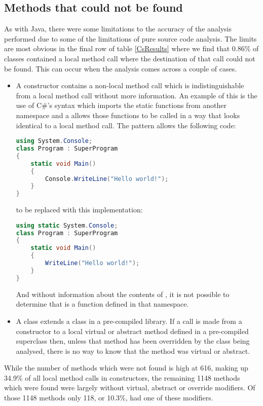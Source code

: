 \subsection{Methods that could not be found}
\label{MethodNotFound}
As with Java, there were some limitations to the accuracy of the analysis performed due to some of the limitations of pure source code analysis. The limits are most obvious in the final row of table \ref{CsResults} where we find that 0.86\% of classes contained a local method call where the destination of that call could not be found. This can occur when the analysis comes across a couple of cases.
\begin{itemize}
	\item A constructor contains a non-local method call which is indistinguishable from a local method call without more information. An example of this is the use of C\#'s  syntax which imports the static functions from another namespace and a allows those functions to be called in a way that looks identical to a local method call. The  pattern allows the following code:
	\begin{lstlisting}[language=cs]
using System.Console;
class Program : SuperProgram
{ 
	static void Main() 
	{ 
		Console.WriteLine("Hello world!"); 
	} 
}
	\end{lstlisting}
	to be replaced with this implementation:
	\begin{lstlisting}[language=cs]
using static System.Console;
class Program : SuperProgram
{ 
	static void Main() 
	{ 
		WriteLine("Hello world!"); 
	} 
}
	\end{lstlisting}
	And without information about the contents of , it is not possible to determine that  is a function defined in that namespace.
	\item A class extends a class in a pre-compiled library. If a call is made from a constructor to a local virtual or abstract method defined in a pre-compiled superclass then, unless that method has been overridden by the class being analysed, there is no way to know that the method was virtual or abstract.
\end{itemize}
While the number of methods which were not found is high at 616, making up 34.9\% of all local method calls in constructors, the remaining 1148 methods which were found were largely without virtual, abstract or override modifiers. Of those 1148 methods only 118, or 10.3\%, had one of these modifiers.

